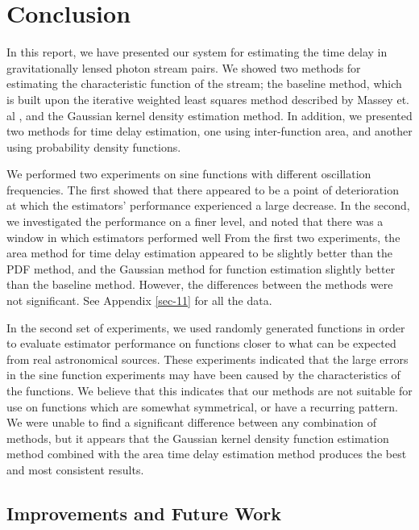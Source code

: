 \documentclass[a4paper,11pt]{article}
\begin{document}
\section{Conclusion}
\label{sec-9}

  In this report, we have presented our system for estimating the time delay in
  gravitationally lensed photon stream pairs. We showed two methods for
  estimating the characteristic function of the stream; the baseline method,
  which is built upon the iterative weighted least squares method described by
  Massey et. al \cite{massey1996estimating}, and the Gaussian kernel density
  estimation method. In addition, we presented two methods for time delay
  estimation, one using inter-function area, and another using probability
  density functions. 

  We performed two experiments on sine functions with different oscillation
  frequencies. The first showed that there appeared to be a point of
  deterioration at which the estimators' performance experienced a large
  decrease. In the second, we investigated the performance on a finer level, and
  noted that there was a window in which estimators performed well From the
  first two experiments, the area method for time delay estimation appeared to
  be slightly better than the PDF method, and the Gaussian method for function
  estimation slightly better than the baseline method. However, the differences
  between the methods were not significant. See Appendix \ref{sec-11} for
  all the data.
  
  In the second set of experiments, we used randomly generated functions in
  order to evaluate estimator performance on functions closer to what can be
  expected from real astronomical sources. These experiments indicated that the
  large errors in the sine function experiments may have been caused by the
  characteristics of the functions. We believe that this indicates that our
  methods are not suitable for use on functions which are somewhat symmetrical,
  or have a recurring pattern. We were unable to find a significant difference
  between any combination of methods, but it appears that the Gaussian kernel
  density function estimation method combined with the area time delay
  estimation method produces the best and most consistent results.
\subsection{Improvements and Future Work}
\label{sec-9-1}
\end{document}
